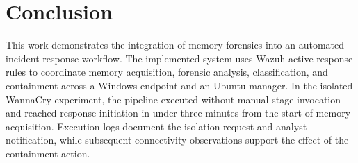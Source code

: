 \documentclass[conference]{IEEEtran}
\begin{document}
\newpage
\section{Conclusion}

This work demonstrates the integration of memory forensics into an automated incident-response workflow. The implemented system uses Wazuh active-response rules to coordinate memory acquisition, forensic analysis, classification, and containment across a Windows endpoint and an Ubuntu manager. In the isolated WannaCry experiment, the pipeline executed without manual stage invocation and reached response initiation in under three minutes from the start of memory acquisition. Execution logs document the isolation request and analyst notification, while subsequent connectivity observations support the effect of the containment action.
\end{document}
